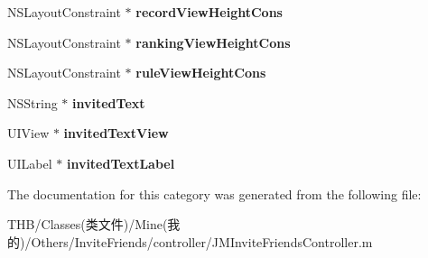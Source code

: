 \begin{DoxyCompactItemize}
\mbox{\label{category_j_m_invite_friends_controller_07_08_a299ee3518c44ce2bc4db7ff9b36edbaa}} 
N\+S\+Layout\+Constraint $\ast$ {\bfseries record\+View\+Height\+Cons}
\item 
\mbox{\label{category_j_m_invite_friends_controller_07_08_a3233f19cce8772adbcf123a691144a2e}} 
N\+S\+Layout\+Constraint $\ast$ {\bfseries ranking\+View\+Height\+Cons}
\item 
\mbox{\label{category_j_m_invite_friends_controller_07_08_a42d0c035276e965952b31310b80859bc}} 
N\+S\+Layout\+Constraint $\ast$ {\bfseries rule\+View\+Height\+Cons}
\item 
\mbox{\label{category_j_m_invite_friends_controller_07_08_ac1b443cfbfff7f2bdfe3da1de63bb091}} 
N\+S\+String $\ast$ {\bfseries invited\+Text}
\item 
\mbox{\label{category_j_m_invite_friends_controller_07_08_a11387eb2e07e672c4bd3956022e0c3a3}} 
U\+I\+View $\ast$ {\bfseries invited\+Text\+View}
\item 
\mbox{\label{category_j_m_invite_friends_controller_07_08_a65162ced3c710cceb42f8a816546b266}} 
U\+I\+Label $\ast$ {\bfseries invited\+Text\+Label}
\end{DoxyCompactItemize}


The documentation for this category was generated from the following file\+:\begin{DoxyCompactItemize}
\item 
T\+H\+B/\+Classes(类文件)/\+Mine(我的)/\+Others/\+Invite\+Friends/controller/J\+M\+Invite\+Friends\+Controller.\+m\end{DoxyCompactItemize}
